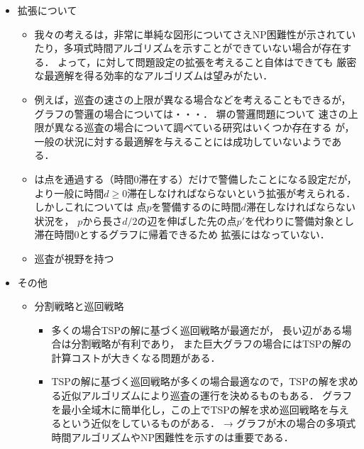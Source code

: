 \begin{itemize}
  \item 拡張について
  \begin{itemize}
    \item
      我々の考える{\patProb}は，非常に単純な図形についてさえNP困難性が示されていたり，多項式時間アルゴリズムを示すことができていない場合が存在する．
      よって，{\patProb}に対して問題設定の拡張を考えること自体はできても
      厳密な最適解を得る効率的なアルゴリズムは望みがたい．
    \item 例えば，巡査の速さの上限が異なる場合などを考えることもできるが，
      グラフの警邏の場合については・・・．
      塀の警邏問題について
      速さの上限が異なる巡査の場合について調べている研究はいくつか存在する\cite{}
      が，一般の状況に対する最適解を与えることには成功していないようである\cite{}．
    \item {\patProb}は点を通過する（時間$0$滞在する）だけで警備したことになる設定だが，
      より一般に時間$d \geq 0$滞在しなければならないという拡張が考えられる．
      しかしこれについては
      点$p$を警備するのに時間$d$滞在しなければならない状況を，
      $p$から長さ$d/2$の辺を伸ばした先の点$p'$を代わりに警備対象とし滞在時間$0$とするグラフに帰着できるため
      拡張にはなっていない．
    \item 巡査が視野を持つ

  \end{itemize}

  \item その他
  \begin{itemize}
    \item 分割戦略と巡回戦略
    \begin{itemize}
      \item 多くの場合TSPの解に基づく巡回戦略が最適だが，
        長い辺がある場合は分割戦略が有利であり，
        また巨大グラフの場合にはTSPの解の計算コストが大きくなる問題がある．
      \item TSPの解に基づく巡回戦略が多くの場合最適なので，TSPの解を求める近似アルゴリズムにより巡査の運行を決めるものもある．
      グラフを最小全域木に簡単化し，この上でTSPの解を求め巡回戦略を与えるという近似をしているものがある．
      → グラフが木の場合の多項式時間アルゴリズムやNP困難性を示すのは重要である．
    \end{itemize} 
  \end{itemize}
\end{itemize}




